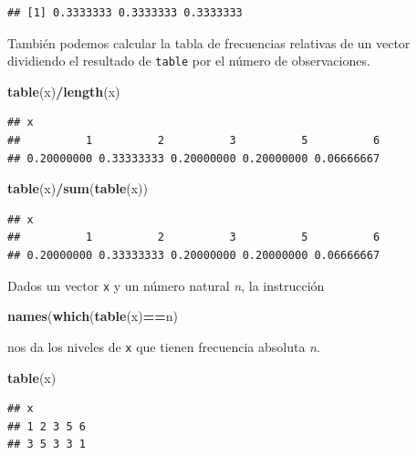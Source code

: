 \documentclass[]{book}
\newenvironment{Shaded}{\begin{snugshade}}{\end{snugshade}}
\newcommand{\KeywordTok}[1]{\textcolor[rgb]{0.13,0.29,0.53}{\textbf{#1}}}
\newcommand{\NormalTok}[1]{#1}
\newcommand{\OperatorTok}[1]{\textcolor[rgb]{0.81,0.36,0.00}{\textbf{#1}}}
\theoremstyle{definition}
\theoremstyle{definition}
\theoremstyle{definition}
\theoremstyle{remark}
\begin{document}
\begin{verbatim}
## [1] 0.3333333 0.3333333 0.3333333
\end{verbatim}

También podemos calcular la tabla de frecuencias relativas de un vector dividiendo el resultado de \texttt{table} por el número de observaciones.

\begin{Shaded}
\begin{Highlighting}[]
\KeywordTok{table}\NormalTok{(x)}\OperatorTok{/}\KeywordTok{length}\NormalTok{(x)}
\end{Highlighting}
\end{Shaded}

\begin{verbatim}
## x
##          1          2          3          5          6 
## 0.20000000 0.33333333 0.20000000 0.20000000 0.06666667
\end{verbatim}

\begin{Shaded}
\begin{Highlighting}[]
\KeywordTok{table}\NormalTok{(x)}\OperatorTok{/}\KeywordTok{sum}\NormalTok{(}\KeywordTok{table}\NormalTok{(x))}
\end{Highlighting}
\end{Shaded}

\begin{verbatim}
## x
##          1          2          3          5          6 
## 0.20000000 0.33333333 0.20000000 0.20000000 0.06666667
\end{verbatim}

Dados un vector \texttt{x} y un número natural \emph{n}, la instrucción

\begin{Shaded}
\begin{Highlighting}[]
\KeywordTok{names}\NormalTok{(}\KeywordTok{which}\NormalTok{(}\KeywordTok{table}\NormalTok{(x)}\OperatorTok{==}\NormalTok{n)}
\end{Highlighting}
\end{Shaded}

nos da los niveles de \texttt{x} que tienen frecuencia absoluta \emph{n}.

\begin{Shaded}
\begin{Highlighting}[]
\KeywordTok{table}\NormalTok{(x)}
\end{Highlighting}
\end{Shaded}

\begin{verbatim}
## x
## 1 2 3 5 6 
## 3 5 3 3 1
\end{verbatim}
\end{document}
